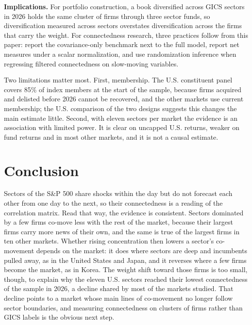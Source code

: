 \documentclass[11pt]{article}
\begin{document}
\textbf{Implications.} For portfolio construction, a book diversified across GICS sectors in 2026 holds the same cluster of firms through three sector funds, so diversification measured across sectors overstates diversification across the firms that carry the weight. For connectedness research, three practices follow from this paper: report the covariance-only benchmark next to the full model, report net measures under a scalar normalization, and use randomization inference when regressing filtered connectedness on slow-moving variables.

Two limitations matter most. First, membership. The U.S. constituent panel covers 85\% of index members at the start of the sample, because firms acquired and delisted before 2026 cannot be recovered, and the other markets use current membership; the U.S. comparison of the two designs suggests this changes the main estimate little. Second, with eleven sectors per market the evidence is an association with limited power. It is clear on uncapped U.S. returns, weaker on fund returns and in most other markets, and it is not a causal estimate.

\section{Conclusion}

Sectors of the S\&P 500 share shocks within the day but do not forecast each other from one day to the next, so their connectedness is a reading of the correlation matrix. Read that way, the evidence is consistent. Sectors dominated by a few firms co-move less with the rest of the market, because their largest firms carry more news of their own, and the same is true of the largest firms in ten other markets. Whether rising concentration then lowers a sector's co-movement depends on the market: it does where sectors are deep and incumbents pulled away, as in the United States and Japan, and it reverses where a few firms become the market, as in Korea. The weight shift toward those firms is too small, though, to explain why the eleven U.S. sectors reached their lowest connectedness of the sample in 2026, a decline shared by most of the markets studied. That decline points to a market whose main lines of co-movement no longer follow sector boundaries, and measuring connectedness on clusters of firms rather than GICS labels is the obvious next step.
\end{document}
